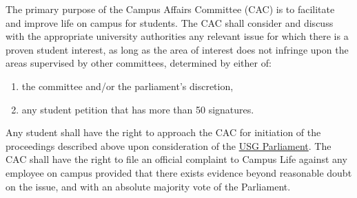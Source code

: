 \label{CACByLawsdef}

\begin{parenum}
\item The primary purpose of the Campus Affairs Committee (CAC)  is to facilitate and improve life on campus for students. The CAC shall consider and discuss with the appropriate university authorities any relevant issue for which there is a proven student interest, as long as the area of interest does not infringe upon the areas supervised by other committees, determined by either of:
\begin{enumerate}
\item the committee and/or the parliament's discretion,
\item any student petition that has more than 50 signatures.
\end{enumerate}

\item Any student shall have the right to approach the CAC for initiation of the proceedings described above upon consideration of the \hyperref[USGParliamentDef]{USG Parliament}.
The CAC shall have the right to file an official complaint to Campus Life against any employee on campus provided that there exists evidence beyond reasonable doubt on the issue, and with an absolute majority vote of the Parliament.

\item {}
\end{parenum}




